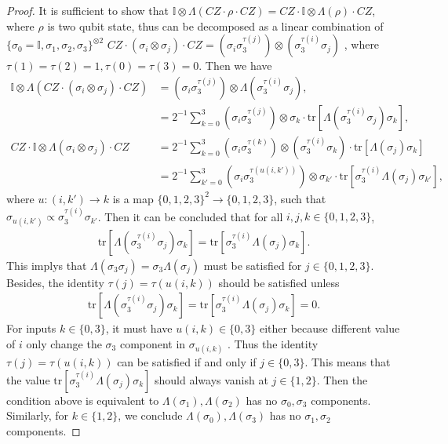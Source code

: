 \documentclass[aps]{revtex4-2}%
\begin{document}
\begin{proof}
    It is sufficient to show that $\mathbb{I}\otimes \Lambda(CZ\cdot \rho \cdot CZ) = CZ \cdot  \mathbb{I}\otimes\Lambda(\rho) \cdot CZ$, where $\rho$ is two qubit state, thus can be decomposed as a linear combination of $\{\sigma_0 = \mathbb{I}, \sigma_1,\sigma_2,\sigma_3\}^{\otimes 2}$   
    $CZ \cdot (\sigma_i \otimes \sigma_j) \cdot CZ = (\sigma_i \sigma_3^{\tau(j)}) \otimes (\sigma_3^{\tau(i)}\sigma_j)$ , where $\tau(1)=\tau(2) = 1, \tau(0)=\tau(3) = 0$. 
    Then we have
    \begin{align}
        \mathbb{I}\otimes \Lambda\left(CZ\cdot (\sigma_i \otimes \sigma_j) \cdot CZ\right)  &= (\sigma_i \sigma_3^{\tau(j)}) \otimes \Lambda(\sigma_3^{\tau(i)}\sigma_j),\\
        &= 2^{-1}\sum_{k=0}^3 (\sigma_i \sigma_3^{\tau(j)}) \otimes \sigma_k \cdot \text{tr}\left[ \Lambda(\sigma_3^{\tau(i)}\sigma_j) \sigma_k\right],\\
        CZ \cdot  \mathbb{I}\otimes\Lambda(\sigma_i \otimes \sigma_j) \cdot CZ&= 2^{-1}\sum_{ k =0}^3 ( \sigma_i\sigma_3^{\tau(k)}) \otimes (\sigma_3^{\tau(i)} \sigma_k) \cdot \text{tr}\left[\Lambda(\sigma_j)\sigma_k\right] \\
        &= 2^{-1}\sum_{k'= 0}^3(\sigma_i \sigma_3^{\tau ( u(i,k'))}) \otimes \sigma_{k'} \cdot \text{tr}\left[\sigma_3^{\tau(i)} \Lambda(\sigma_j) \sigma_{k'}\right],
    \end{align}
    where $u: (i,k') \to k$ is a map $\{0,1,2,3\}^2 \to \{0,1,2,3\}$,  such that  $  \sigma_{u(i,k')}\propto\sigma_{3}^{\tau(i)}\sigma_{k'}  $.   
    Then it can be concluded that for all $i,j,k \in \{0,1,2,3\}$, 
     \begin{align}
        \text{tr}\left[ \Lambda(\sigma_3^{\tau(i)}\sigma_j) \sigma_k\right] = \text{tr}\left[\sigma_3^{\tau(i)} \Lambda(\sigma_j) \sigma_{k}\right].
    \end{align}
    This implys that $\Lambda(\sigma_3\sigma_j ) = \sigma_3\Lambda(\sigma_j)$ must be satisfied for $j \in \{0,1,2,3\}$.
    Besides, the identity $\tau(j) = \tau(u(i,k))$ should be satisfied unless 
    \begin{align}
        \text{tr}\left[ \Lambda(\sigma_3^{\tau(i)}\sigma_j) \sigma_k\right] = \text{tr}\left[\sigma_3^{\tau(i)} \Lambda(\sigma_j) \sigma_{k}\right] = 0.
    \end{align}
    For inputs $k \in \{0,3\}$, it must have $u(i,k) \in \{0,3\}$ either because different value of $i$ only change the $\sigma_3$ component in $\sigma_{u(i,k)}$  . 
    Thus the identity $\tau(j) = \tau(u(i,k))$ can be satisfied if and only if $j \in \{0,3\}$. 
    This means that the value $\text{tr}\left[\sigma_3^{\tau(i)} \Lambda(\sigma_j) \sigma_{k}\right]$ should always vanish at  $j \in \{1,2\}$.
    Then the condition above is equivalent to $\Lambda(\sigma_1), \Lambda(\sigma_2)$ has no $\sigma_0, \sigma_3$ components. 
    Similarly, for $k \in \{1,2\}$, we conclude $\Lambda(\sigma_0), \Lambda(\sigma_3)$ has no $\sigma_1,\sigma_2$ components.


\end{proof}
\end{document}

